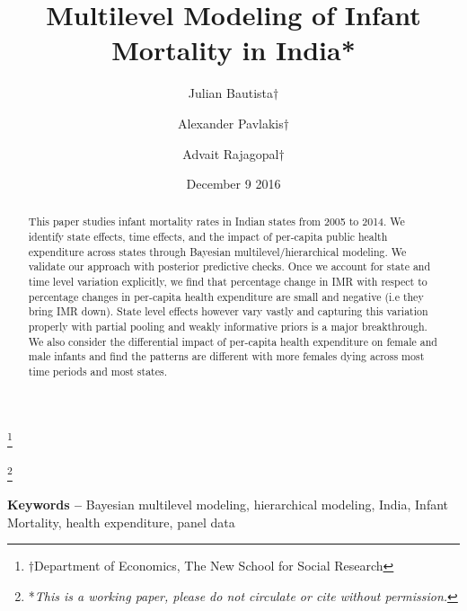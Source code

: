 \documentclass{article}
\title{Multilevel Modeling of Infant Mortality in India*}
\author{Julian Bautista$\dag$\\
 \and
 Alexander Pavlakis$\dag$\\
 \and
 Advait Rajagopal$\dag$
 }
\date{December 9 2016}
\providecommand{\keywords}[1]{\textbf{Keywords --} #1}
\newcommand\blfootnote[1]{%
  \begingroup
  \renewcommand\thefootnote{}\footnote{#1}%
  \addtocounter{footnote}{-1}%
  \endgroup
}
\begin{document}
\maketitle
\blfootnote{$\dag${Department of Economics, The New School for Social Research}}
\blfootnote{*\textit{This is a working paper, please do not circulate or cite without permission.}}




\begin{abstract}
This paper studies infant mortality rates in Indian states from 2005 to 2014.  We identify state effects, time effects, and the impact of per-capita public health expenditure across states through Bayesian multilevel/hierarchical modeling. We validate our approach with posterior predictive checks. Once we account for state and time level variation explicitly, we find that percentage change in IMR with respect to percentage changes in per-capita health expenditure are small and negative (i.e they bring IMR down). State level effects however vary vastly and capturing this variation properly with partial pooling and weakly informative priors is a major breakthrough. We also consider the differential impact of per-capita health expenditure on female and male infants and find the patterns are different with more females dying across most time periods and most states.
\end{abstract}

\keywords{Bayesian multilevel modeling, hierarchical modeling, India, Infant Mortality, health expenditure, panel data}

\newpage

\tableofcontents
\newpage

\end{document}
